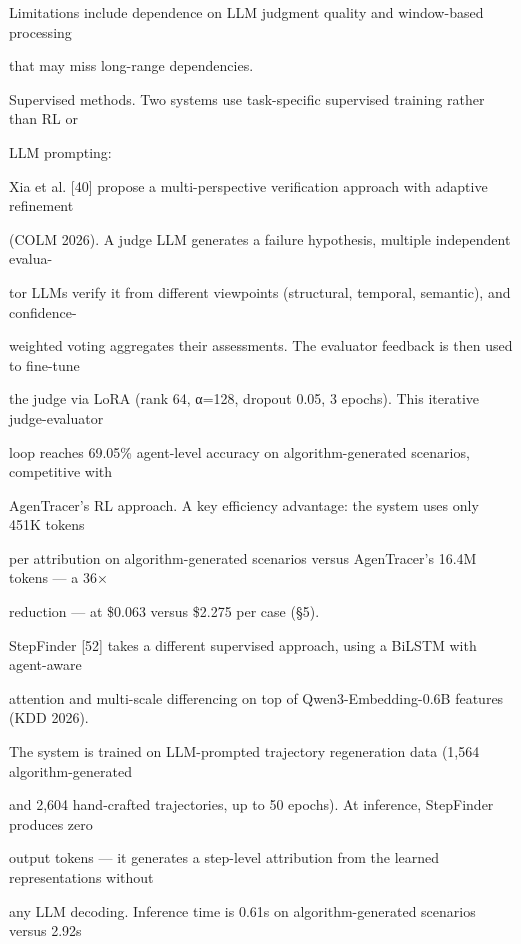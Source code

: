 \begin{flushleft}
\noindent  Limitations include dependence on LLM judgment quality and window-based processing\par
\noindent  that may miss long-range dependencies.\par
\par\smallskip
\noindent Supervised methods. Two systems use task-specific supervised training rather than RL or\par
\noindent LLM prompting:\par
\noindent  Xia et al. [40] propose a multi-perspective verification approach with adaptive refinement\par
\noindent (COLM 2026). A judge LLM generates a failure hypothesis, multiple independent evalua-\par
\noindent tor LLMs verify it from different viewpoints (structural, temporal, semantic), and confidence-\par
\noindent weighted voting aggregates their assessments. The evaluator feedback is then used to fine-tune\par
\noindent the judge via LoRA (rank 64, α=128, dropout 0.05, 3 epochs). This iterative judge-evaluator\par
\noindent loop reaches 69.05\% agent-level accuracy on algorithm-generated scenarios, competitive with\par
\noindent AgenTracer’s RL approach. A key efficiency advantage: the system uses only 451K tokens\par
\noindent per attribution on algorithm-generated scenarios versus AgenTracer’s 16.4M tokens — a 36×\par
\noindent reduction — at \$0.063 versus \$2.275 per case (§5).\par
\noindent  StepFinder [52] takes a different supervised approach, using a BiLSTM with agent-aware\par
\noindent attention and multi-scale differencing on top of Qwen3-Embedding-0.6B features (KDD 2026).\par
\noindent The system is trained on LLM-prompted trajectory regeneration data (1,564 algorithm-generated\par
\noindent and 2,604 hand-crafted trajectories, up to 50 epochs). At inference, StepFinder produces zero\par
\noindent output tokens — it generates a step-level attribution from the learned representations without\par
\noindent any LLM decoding. Inference time is 0.61s on algorithm-generated scenarios versus 2.92s\par

\end{flushleft}
